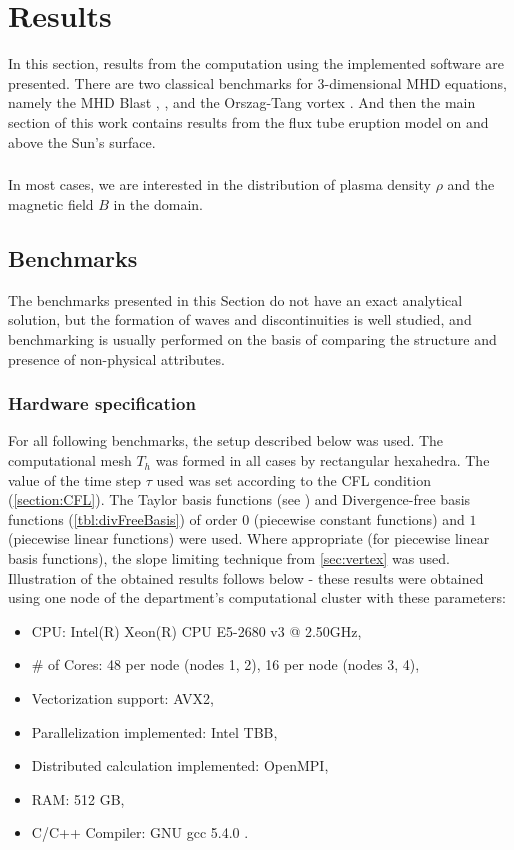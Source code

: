 \chapter{Results}
In this section, results from the computation using the implemented software are presented. There are two classical benchmarks for 3-dimensional MHD equations, namely the MHD Blast \cite{blast1}, \cite{blast2}, and the Orszag-Tang vortex \cite{vortex}. And then the main section of this work contains results from the flux tube eruption model on and above the Sun's surface.
\paragraph{}
In most cases, we are interested in the distribution of plasma density $\rho$ and the magnetic field $B$ in the domain.

\section{Benchmarks}
\label{sec:benchmarks}
The benchmarks presented in this Section do not have an exact analytical solution, but the formation of waves and discontinuities is well studied, and benchmarking is usually performed on the basis of comparing the structure and presence of non-physical attributes.
\subsection{Hardware specification}
For all following benchmarks, the setup described below was used. The computational mesh $T_h$ was formed in all cases by rectangular hexahedra.
The value of the time step $\tau$ used was set according to the CFL condition (\cref{section:CFL}).
The Taylor basis functions (see \cite{KuzminVertex}) and Divergence-free basis functions (\cref{tbl:divFreeBasis}) of order $0$ (piecewise constant functions) and $1$ (piecewise linear functions) were used.
Where appropriate (for piecewise linear basis functions), the slope limiting technique from \cref{sec:vertex} was used.
Illustration of the obtained results follows below - these results were obtained using one node of the department's computational cluster with these parameters:
\begin{itemize}
    \item CPU: Intel(R) Xeon(R) CPU E5-2680 v3 @ 2.50GHz,
    \item \# of Cores: 48 per node (nodes 1, 2), 16 per node (nodes 3, 4),
    \item Vectorization support: AVX2,
    \item Parallelization implemented: Intel TBB,
    \item Distributed calculation implemented: OpenMPI,
    \item RAM: 512 GB,
    \item C/C++ Compiler: GNU gcc 5.4.0 .
\end{itemize}

